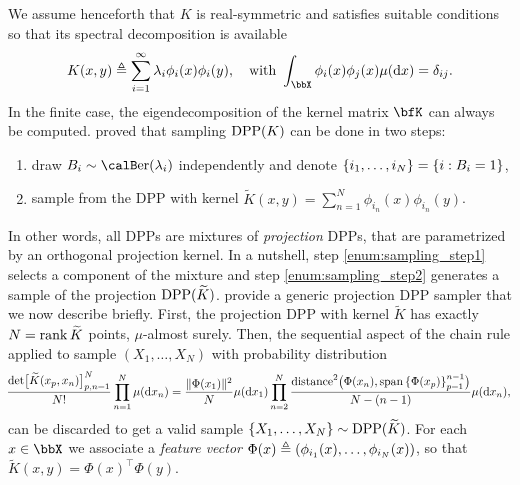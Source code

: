 \documentclass[twoside,11pt]{article}
\begin{document}
        We assume henceforth that $K$ is real-symmetric and satisfies suitable conditions \cite[Theorem 3]{Sos00} so that its spectral decomposition is available
        \begin{equation*}
        \label{eq:eigdec_kernel}
        K(x,y)
        \triangleq
          \suml_{i=1}^{\infty}
            \lambda_i \phi_i(x) \phi_i(y),
          \quad \text{with }
            \int_{\bbX} \phi_i(x) \phi_j(x) \mu(\diff x) = \delta_{ij}.
        \end{equation*}
        In the finite case,
        the eigendecomposition of the kernel matrix $\bfK$ can always be computed.
        \citet[Theorem 7]{HKPV06} proved that sampling $\operatorname{DPP}(K)$ can be done in two steps:
        \begin{enumerate}
            \item draw $B_i\sim\Ber(\lambda_i)$ independently and denote $\left\{ i_1,\dots,i_{N} \right\} = \left\{ i:B_i=1 \right\}$,\label{enum:sampling_step1}
            \item sample from the DPP with kernel $\tilde{K}(x,y) = \sum_{n=1}^{N}\phi_{i_n}(x) \phi_{i_n}(y)$.\label{enum:sampling_step2}
        \end{enumerate}
        In other words, all DPPs are mixtures of \emph{projection} DPPs, that are parametrized by an orthogonal projection kernel.
        In a nutshell, step \ref{enum:sampling_step1} selects a component of the mixture and step \ref{enum:sampling_step2} generates a sample of the projection $\operatorname{DPP}(\widetilde{K})$.
        \citet[Algorithm 18]{HKPV06} provide a generic projection DPP sampler that we now describe briefly.
        First, the projection DPP with kernel $\tilde{K}$ has exactly $N=\operatorname{rank} \widetilde{K}$ points, $\mu$-almost surely.
        Then, the sequential aspect of the chain rule applied to sample $(X_1,\dots,X_N)$ with probability distribution
        \begin{equation}
        \label{eq:joint_distribution}
        \!
        \small
        \frac{\det\!\big[\widetilde K(x_p,x_n)\big]_{p,n=1}^N}{N!}
            \prod_{n=1}^N \mu(\mathop{}\!\mathrm{d} x_n)
        =
                \frac{\|\Phi(x_1)\|^2}{N}
            \mu(\mathop{}\!\mathrm{d} x_1)
            \prod_{n=2}^{N}
                \frac{\operatorname{distance}^2\!\big(\Phi(x_n), \operatorname{span}\left\{ \Phi(x_p) \right\}_{p=1}^{n-1}\!\big)}{N-(n-1)}
                \mu(\mathop{}\!\mathrm{d} x_n),
        \end{equation}
        can be discarded to get a valid sample $\left\{ X_{1}, \dots, X_{N} \right\} \sim \operatorname{DPP}(\widetilde{K})$.
        For each $x\in\bbX$ we associate a \emph{feature vector}
        $\Phi(x) \triangleq \left( \phi_{i_1}(x),\dots,\phi_{i_N}(x) \right)$,
        so that
        $\tilde{K}(x,y) = \Phi(x)^{\top} \Phi(y)$.
\end{document}
